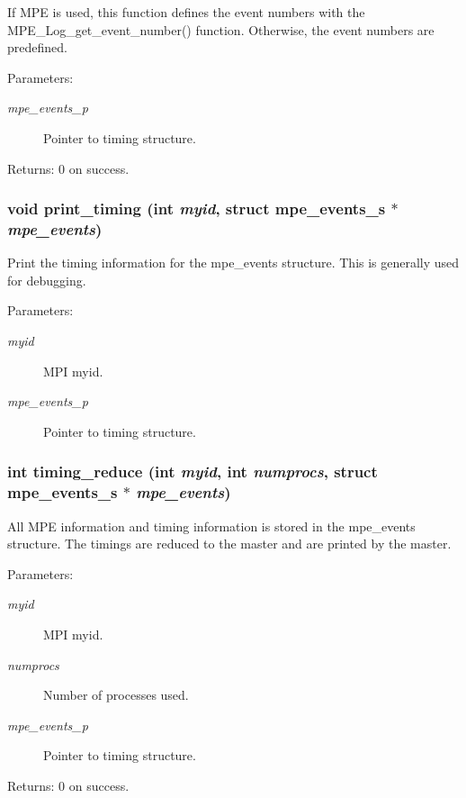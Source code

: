 If MPE is used, this function defines the event numbers with the MPE\_\-Log\_\-get\_\-event\_\-number() function. Otherwise, the event numbers are predefined.

\begin{Desc}
\item[Parameters:]
\begin{description}
\item[{\em mpe\_\-events\_\-p}]Pointer to timing structure. \end{description}
\end{Desc}
\begin{Desc}
\item[Returns:]0 on success. \end{Desc}
\subsubsection{\setlength{\rightskip}{0pt plus 5cm}void print\_\-timing (int {\em myid}, struct \bf{mpe\_\-events\_\-s} $\ast$ {\em mpe\_\-events})}\label{mpe__init_8h_7c07a6204913a60e91dd3d81e8a970c3}


Print the timing information for the mpe\_\-events structure. This is generally used for debugging.

\begin{Desc}
\item[Parameters:]
\begin{description}
\item[{\em myid}]MPI myid. \item[{\em mpe\_\-events\_\-p}]Pointer to timing structure. \end{description}
\end{Desc}
\subsubsection{\setlength{\rightskip}{0pt plus 5cm}int timing\_\-reduce (int {\em myid}, int {\em numprocs}, struct \bf{mpe\_\-events\_\-s} $\ast$ {\em mpe\_\-events})}\label{mpe__init_8h_8ef68542f1212a1cc22de50f891678f5}


All MPE information and timing information is stored in the mpe\_\-events structure. The timings are reduced to the master and are printed by the master.

\begin{Desc}
\item[Parameters:]
\begin{description}
\item[{\em myid}]MPI myid. \item[{\em numprocs}]Number of processes used. \item[{\em mpe\_\-events\_\-p}]Pointer to timing structure. \end{description}
\end{Desc}
\begin{Desc}
\item[Returns:]0 on success. \end{Desc}
